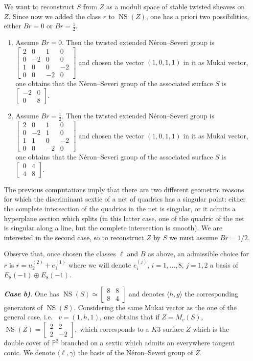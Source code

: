 \documentclass{amsart}
\theoremstyle{definition}
\numberwithin{equation}{section}
\numberwithin{equation}{section} \theoremstyle{definition}
\DeclareMathOperator{\NS}{NS}
\begin{document}
We want to reconstruct $S$ from $Z$ as a moduli space of stable twisted sheaves on $Z$. Since now we added the class $r$ to $\NS(Z)$, one has a priori two possibilities, either $Br=0$ or $Br=\frac{1}{2}$. \begin{enumerate}\item Assume $Br=0$. Then the twisted extended N\'eron--Severi group is $\left[\begin{array}{rrrr}2&0&1&0\\
0&-2&0&0\\1&0&0&-2\\0&0&-2&0\end{array}\right]$ and chosen the vector $(1,0,1,1)$ in it as Mukai vector, one obtains that the N\'eron--Severi group of the associated surface $S$ is $\left[\begin{array}{rr}-2&0\\0&8\end{array}\right]$.
\item Assume $Br=\frac{1}{2}$. Then the twisted extended N\'eron--Severi group is $\left[\begin{array}{rrrr}2&0&1&0\\
0&-2&1&0\\1&1&0&-2\\0&0&-2&0\end{array}\right]$ and chosen the vector $(1,0,1,1)$ in it as Mukai vector, one obtains that the N\'eron--Severi group of the associated surface $S$ is $\left[\begin{array}{rr}0&4\\4&8\end{array}\right]$.
\end{enumerate}
The previous computations imply that there are two different geometric reasons for which the discriminant sextic of a net of quadrics has a singular point: either the complete intersection of the quadrics in the net is singular, or it admits a hyperplane section which splits (in this latter case, one of the quadric of the net is singular along a line, but the complete intersection is smooth).
We are interested in the second case, so to reconstruct $Z$ by $S$ we must assume $Br=1/2$.


Observe that, once chosen the classes $\ell$ and $B$ as above, an admissible choice for $r$ is $r=u_2^{(2)}+e_1^{(1)}$ where we will denote $e_i^{(j)}$, $i=1,\ldots, 8$, $j=1,2$ a basis of $E_8(-1)\oplus E_8(-1)$.

{\it {\bf Case b)}.} One has $\NS(S)\simeq \left[\begin{array}{cc}8&8\\8&4\end{array}\right]$ and denotes $\langle h,g\rangle$ the corresponding generators of $\NS(S)$.
Considering the same Mukai vector as the one of the general case, i.e.~ $v=(1,h,1)$, one obtains that if $Z=M_v(S)$, $\NS(Z)=\left[\begin{array}{rr}2&2\\2&-2\end{array}\right],$ which corresponds to a $K3$ surface $Z$ which is the double cover of $\mathbb{P}^2$ branched on a sextic which admits an everywhere tangent conic.  We denote $\langle \ell, \gamma\rangle$ the basis of the N\'eron--Severi group of $Z$.
\end{document}
